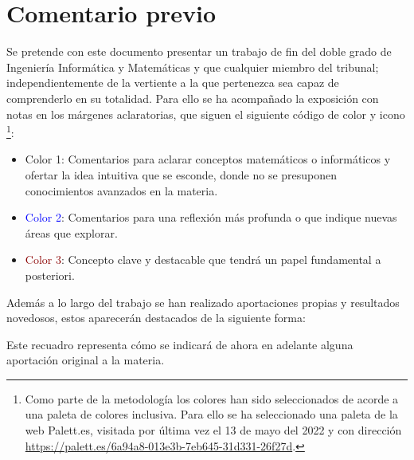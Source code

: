 
\section*{Comentario previo}

Se pretende con este documento presentar un  trabajo de fin del doble grado de Ingeniería Informática y Matemáticas y que cualquier miembro del tribunal; 
independientemente de la vertiente a la que pertenezca sea capaz de comprenderlo en su totalidad.  
Para ello se ha acompañado la exposición con notas en los márgenes aclaratorias, que siguen el siguiente código de color y icono \footnote{Como parte de la metodología los colores han sido seleccionados de acorde a una paleta de colores inclusiva.
Para ello se ha seleccionado una paleta de la web Palett.es, 
visitada por última vez el 13 de mayo del 2022 
y con dirección \url{https://palett.es/6a94a8-013e3b-7eb645-31d331-26f27d}.
 }: 

\begin{itemize}
    \item  \iconoAclaraciones \textcolor{dark_green}{ Color 1}: Comentarios para 
    aclarar conceptos matemáticos o informáticos y ofertar la idea intuitiva que 
    se esconde, donde no se presuponen conocimientos avanzados en 
    la materia. 
    \item  \iconoProfundizar \textcolor{blue}{  Color 2}: Comentarios para una reflexión más profunda o que indique nuevas áreas que explorar. 
    \item  \iconoClave  \textcolor{darkRed}{  Color 3}: Concepto clave y destacable que tendrá un papel fundamental a posteriori.  
\end{itemize}

Además a lo largo del trabajo se han realizado aportaciones propias y resultados novedosos, estos aparecerán destacados de la siguiente forma: 

\begin{aportacionOriginal}
    Este recuadro representa cómo se indicará de ahora en adelante alguna aportación original a la materia. 
\end{aportacionOriginal}
